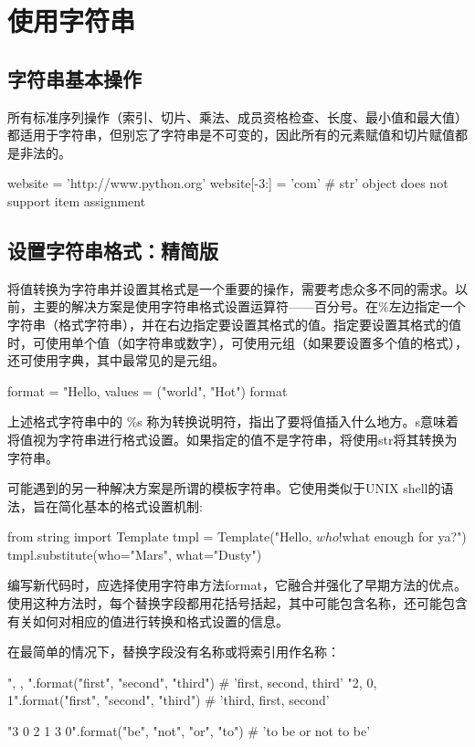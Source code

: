 \chapter{使用字符串\label{chapter03}}
\section{字符串基本操作}
所有标准序列操作（索引、切片、乘法、成员资格检查、长度、最小值和最大值）都适用于字符串，但别忘了字符串是不可变的，因此所有的元素赋值和切片赋值都是非法的。
\begin{pyc}
website = 'http://www.python.org'
website[-3:] = 'com'  # str' object does not support item assignment
\end{pyc}
\section{设置字符串格式：精简版}
将值转换为字符串并设置其格式是一个重要的操作，需要考虑众多不同的需求。以前，主要的解决方案是使用字符串格式设置运算符——百分号。在\%左边指定一个字符串（格式字符串），并在右边指定要设置其格式的值。指定要设置其格式的值时，可使用单个值（如字符串或数字），可使用元组（如果要设置多个值的格式），还可使用字典，其中最常见的是元组。
\begin{pyc}
format = "Hello, %
values = ("world", "Hot")
format %
\end{pyc}
上述格式字符串中的 \%s 称为转换说明符，指出了要将值插入什么地方。s意味着将值视为字符串进行格式设置。如果指定的值不是字符串，将使用str将其转换为字符串。

可能遇到的另一种解决方案是所谓的模板字符串。它使用类似于UNIX shell的语法，旨在简化基本的格式设置机制:
\begin{pyc}
from string import Template
tmpl = Template("Hello, $who! $what enough for ya?")
tmpl.substitute(who="Mars", what="Dusty")
\end{pyc}

编写新代码时，应选择使用字符串方法format，它融合并强化了早期方法的优点。使用这种方法时，每个替换字段都用花括号括起，其中可能包含名称，还可能包含有关如何对相应的值进行转换和格式设置的信息。

在最简单的情况下，替换字段没有名称或将索引用作名称：
\begin{pyc}
"{}, {}, {}".format("first", "second", "third")  # 'first, second, third'
"{2}, {0}, {1}".format("first", "second", "third")  # 'third, first, second'

"{3} {0} {2} {1} {3} {0}".format("be", "not", "or", "to")
# 'to be or not to be'
\end{pyc}

